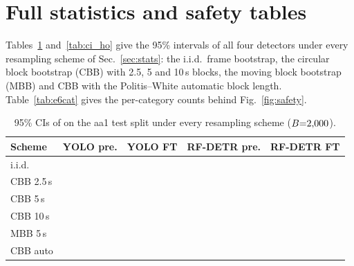 \section{Full statistics and safety tables}
\label{app:stats}
Tables~\ref{tab:ci_aa1} and~\ref{tab:ci_ho} give the 95\% \AP{} intervals of all four detectors under every
resampling scheme of Sec.~\ref{sec:stats}: the i.i.d.\ frame bootstrap, the circular block bootstrap (CBB) with
2.5, 5 and 10\,s blocks, the moving block bootstrap (MBB) and CBB with the Politis--White automatic block length.
Table~\ref{tab:e6cat} gives the per-category counts behind Fig.~\ref{fig:safety}.
\begin{table}[!htbp]
\centering
\caption{95\% CIs of \AP{} on the aa1 test split under every resampling scheme ($B{=}2{,}000$).}
\label{tab:ci_aa1}
\scriptsize\setlength{\tabcolsep}{1.5pt}
\begin{tabular}{lcccc}
\toprule
Scheme & YOLO pre. & YOLO FT & RF-DETR pre. & RF-DETR FT \\
\midrule
i.i.d. & \ci{\TcAaIidYoloPtLo}{\TcAaIidYoloPtHi} & \ci{\TcAaIidYoloFtLo}{\TcAaIidYoloFtHi} & \ci{\TcAaIidRfPtLo}{\TcAaIidRfPtHi} & \ci{\TcAaIidRfFtLo}{\TcAaIidRfFtHi} \\
CBB 2.5\,s & \ci{\TcAaCbbAYoloPtLo}{\TcAaCbbAYoloPtHi} & \ci{\TcAaCbbAYoloFtLo}{\TcAaCbbAYoloFtHi} & \ci{\TcAaCbbARfPtLo}{\TcAaCbbARfPtHi} & \ci{\TcAaCbbARfFtLo}{\TcAaCbbARfFtHi} \\
CBB 5\,s & \ci{\TcAaCbbBYoloPtLo}{\TcAaCbbBYoloPtHi} & \ci{\TcAaCbbBYoloFtLo}{\TcAaCbbBYoloFtHi} & \ci{\TcAaCbbBRfPtLo}{\TcAaCbbBRfPtHi} & \ci{\TcAaCbbBRfFtLo}{\TcAaCbbBRfFtHi} \\
CBB 10\,s & \ci{\TcAaCbbCYoloPtLo}{\TcAaCbbCYoloPtHi} & \ci{\TcAaCbbCYoloFtLo}{\TcAaCbbCYoloFtHi} & \ci{\TcAaCbbCRfPtLo}{\TcAaCbbCRfPtHi} & \ci{\TcAaCbbCRfFtLo}{\TcAaCbbCRfFtHi} \\
MBB 5\,s & \ci{\TcAaMbbBYoloPtLo}{\TcAaMbbBYoloPtHi} & \ci{\TcAaMbbBYoloFtLo}{\TcAaMbbBYoloFtHi} & \ci{\TcAaMbbBRfPtLo}{\TcAaMbbBRfPtHi} & \ci{\TcAaMbbBRfFtLo}{\TcAaMbbBRfFtHi} \\
CBB auto & \ci{\TcAaCbbAutoYoloPtLo}{\TcAaCbbAutoYoloPtHi} & \ci{\TcAaCbbAutoYoloFtLo}{\TcAaCbbAutoYoloFtHi} & \ci{\TcAaCbbAutoRfPtLo}{\TcAaCbbAutoRfPtHi} & \ci{\TcAaCbbAutoRfFtLo}{\TcAaCbbAutoRfFtHi} \\
\bottomrule
\end{tabular}
\end{table}
